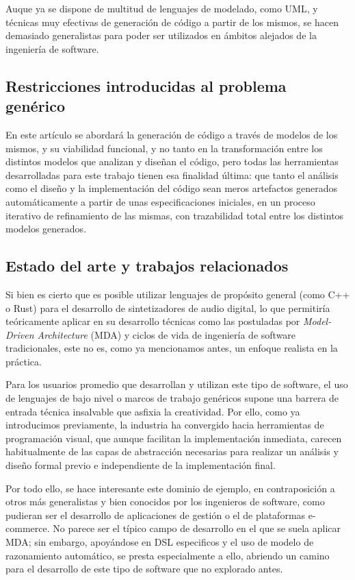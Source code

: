 Auque ya se dispone de multitud de lenguajes de modelado, como UML, y técnicas muy efectivas de generación de código a partir de los mismos, se hacen demasiado generalistas para poder ser utilizados en ámbitos alejados de la ingeniería de software. 

\subsection{Restricciones introducidas al problema genérico}

En este artículo se abordará la generación de código a través de modelos de los mismos, y su viabilidad funcional, y no tanto en la transformación entre los distintos modelos que analizan y diseñan el código, pero todas las herramientas desarrolladas para este trabajo tienen esa finalidad última: que tanto el análisis como el diseño y la implementación del código sean meros artefactos generados automáticamente a partir de unas especificaciones iniciales, en un proceso iterativo de refinamiento de las mismas, con trazabilidad total entre los distintos modelos generados.


\subsection{Estado del arte y trabajos relacionados}

Si bien es cierto que es posible utilizar lenguajes de propósito general (como C++ o Rust) para el desarrollo de sintetizadores de audio digital, lo que permitiría teóricamente aplicar en su desarrollo técnicas como las postuladas por \textit{Model-Driven Architecture} (MDA) y ciclos de vida de ingeniería de software tradicionales, este no es, como ya mencionamos antes, un enfoque realista en la práctica.  

Para los usuarios promedio que desarrollan y utilizan este tipo de software, el uso de lenguajes de bajo nivel o marcos de trabajo genéricos supone una barrera de entrada técnica insalvable que asfixia la creatividad. Por ello, como ya introducimos previamente, la industria ha convergido hacia herramientas de programación visual, que aunque facilitan la implementación inmediata, carecen habitualmente de las capas de abstracción necesarias para realizar un análisis y diseño formal previo e independiente de la implementación final. 

Por todo ello, se hace interesante este dominio de ejemplo, en contraposición a otros más generalistas y bien conocidos por los ingenieros de software, como pudieran ser el desarrollo de aplicaciones de gestión o el de plataformas e-commerce. No parece ser el típico campo de desarrollo en el que se suela aplicar MDA; sin embargo, apoyándose en DSL especificos y el uso de modelo de razonamiento automático, se presta especialmente a ello, abriendo un camino para el desarrollo de este tipo de software que no explorado antes.


